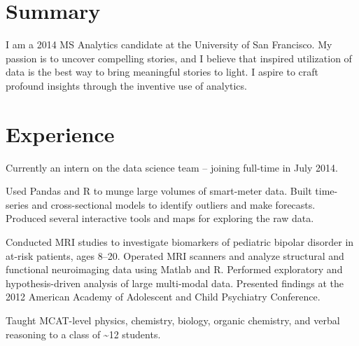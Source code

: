 \documentclass[]{deedy-resume-openfont}
\begin{document}
\begin{minipage}[t]{0.66\textwidth} 


\section{Summary}
I am a 2014 MS Analytics candidate at the University of San Francisco. My passion is to uncover compelling stories, and I believe that inspired utilization of data is the best way to bring meaningful stories to light. I aspire to craft profound insights through the inventive use of analytics.
\sectionsep


\section{Experience}

\vspace{\topsep}
Currently an intern on the data science team -- joining full-time in July 2014.
\sectionsep

\vspace{\topsep} %
Used Pandas and R to munge large volumes of smart-meter data. Built time- series and cross-sectional models to identify outliers and make forecasts. Produced several interactive tools and maps for exploring the raw data.
\sectionsep

\vspace{\topsep} %
Conducted MRI studies to investigate biomarkers of pediatric bipolar disorder in at-risk patients, ages 8–20. Operated MRI scanners and analyze structural and functional neuroimaging data using Matlab and R. Performed exploratory and hypothesis-driven analysis of large multi-modal data. Presented findings at the 2012 American Academy of Adolescent and Child Psychiatry Conference.
\sectionsep

\vspace{\topsep} %
Taught MCAT-level physics, chemistry, biology, organic chemistry, and verbal reasoning to a class of \textasciitilde12 students.
\sectionsep


\end{minipage}
\end{document}
